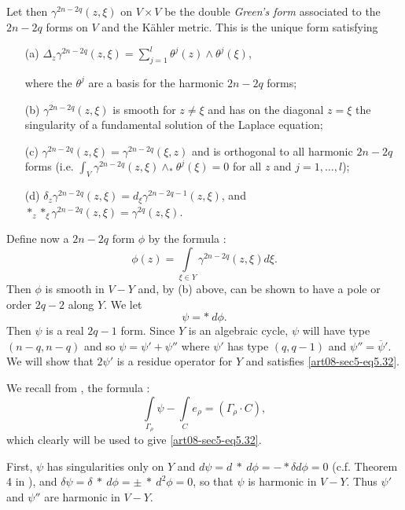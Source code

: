 Let then $\gamma^{2n-2q}(z,\xi)$ on $V\times V$ be the double {\em Green's form} associated to the $2n-2q$ forms on $V$ and the K\"ahler metric. This is the unique form satisfying
\begin{itemize}
\item[(a)]\pageoriginale \hfill $\Delta_{z}\gamma^{2n-2q}(z,\xi)=\sum\limits^{l}_{j=1}\theta^{j}(z)\wedge \theta^{j}(\xi)$,\hfill\,

where the $\theta^{j}$ are a basis for the harmonic $2n-2q$ forms;

\item[(b)] $\gamma^{2n-2q}(z,\xi)$ is smooth for $z\neq\xi$ and has on the diagonal $z=\xi$ the singularity of a fundamental solution of the Laplace equation;

\item[(c)] $\gamma^{2n-2q}(z,\xi)=\gamma^{2n-2q}(\xi,z)$ and is orthogonal to all harmonic $2n-2q$ forms (i.e. $\int_{V}\gamma^{2n-2q}(z,\xi)\wedge_{*}\theta^{j}(\xi)=0$ for all $z$ and $j=1,\ldots,l$); 

\item[(d)] $\delta_{z}\gamma^{2n-2q}(z,\xi)=d_{\xi}\gamma^{2n-2q-1}(z,\xi)$, and $*_{z}*_{\xi}\gamma^{2n-2q}(z,\xi)=\gamma^{2q}(z,\xi)$.
\end{itemize}

Define now a $2n-2q$ form $\phi$ by the formula :
\begin{equation}
\phi(z)=\int\limits_{\xi\in Y}\gamma^{2n-2q}(z,\xi)d\xi.\label{art08-sec5-eq5.33}
\end{equation}
Then $\phi$ is smooth in $V-Y$ and, by (b) above, can be shown to have a pole or order $2q-2$ along $Y$. We let
\begin{equation}
\psi=* \ d\phi.\label{art08-sec5-eq5.34}
\end{equation}
Then $\psi$ is a real $2q-1$ form. Since $Y$ is an algebraic cycle, $\psi$ will have type $(n-q,n-q)$ and so $\psi=\psi'+\psi''$ where $\psi'$ has type $(q,q-1)$ and $\psi''=\overline{\psi}'$. We will show that $2\psi'$ is a residue operator for $Y$ and satisfies \eqref{art08-sec5-eq5.32}.

We recall from \cite{art08-key17}, the formula :
\begin{equation}
\int\limits_{\Gamma_{\rho}}\psi-\int\limits_{C}e_{\rho}=(\Gamma_{\rho}\cdot C),\label{art08-sec5-eq5.35}
\end{equation}
which clearly will be used to give \eqref{art08-sec5-eq5.32}.

First, $\psi$ has singularities only on $Y$ and $d\psi=d \ * \ d\phi=-*\delta d\phi=0$ (c.f. Theorem 4 in \cite{art08-key17}), and $\delta\psi=\delta \ * \ d\phi=\pm \ * \ d^{2}\phi=0$, so that $\psi$ is harmonic in $V-Y$. Thus $\psi'$ and $\psi''$ are harmonic in $V-Y$.

